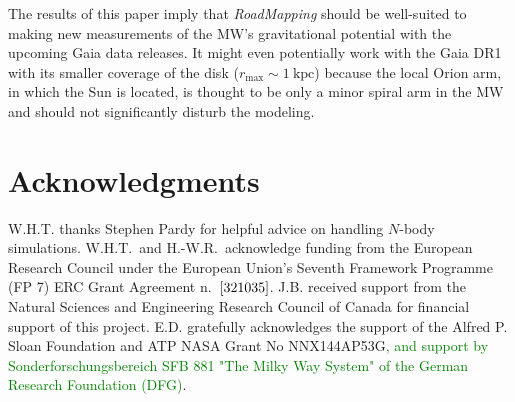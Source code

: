 \documentclass[iop,revtex4,numberedappendix,appendixfloats]{emulateapj}
\newcommand{\RM}{{\sl RoadMapping}}
\newcommand{\NEW}[1]{\textcolor{Green}{#1}}
\newcommand{\OLD}[1]{}
\begin{document}
\OLD{The simulations we analyzed do not have a prominent bar, and so we have not explicitly explored the impact of such a feature. Bars can play an important role in the dynamics when very small volumes near a resonance are considered (e.g. \citealt{2000AJ....119..800D}). When considering volumes of $\gtrsim 1~\text{kpc}$, we have no reason to believe that this should severely affect the robustness of such an analysis.}

The results of this paper imply that \RM{} should be well-suited to making new measurements of the MW's gravitational potential with the upcoming Gaia data releases. It might even potentially work with the Gaia DR1 with its smaller coverage of the disk ($r_\text{max}\sim 1~\text{kpc}$) because the local Orion arm, in which the Sun is located, is thought to be only a minor spiral arm in the MW and should not significantly disturb the modeling. 


\section{Acknowledgments}

W.H.T. thanks Stephen Pardy for helpful advice on handling $N$-body simulations. W.H.T.\ and H.-W.R.~acknowledge funding from the European Research Council under the European Union’s Seventh Framework Programme (FP 7) ERC Grant Agreement n.~${\rm [321035]}$. J.B. received support from the Natural Sciences and Engineering Research Council of Canada for financial support of this project. E.D. gratefully acknowledges the support of the Alfred P. Sloan Foundation and ATP NASA Grant No NNX144AP53G\NEW{, and support by Sonderforschungsbereich SFB 881 "The Milky Way System" of the German Research Foundation (DFG)}. 


{}

\end{document}
